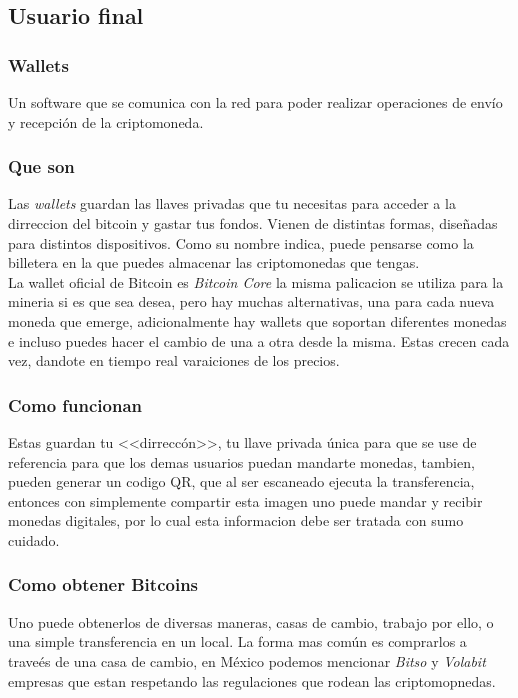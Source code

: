 \documentclass[12pt,letterpaper]{article}
\begin{document}
    \subsection*{Usuario final}

        \subsubsection*{Wallets}
Un software que se comunica con la red para poder realizar operaciones de env\'io y recepci\'on de la criptomoneda.

        \subsubsection*{Que son}
            Las \textit{wallets} guardan las llaves privadas que tu necesitas para acceder a la dirreccion del bitcoin y gastar tus fondos. Vienen de distintas formas, dise\~nadas para distintos dispositivos. Como su nombre indica, puede pensarse como la billetera en la que puedes almacenar las criptomonedas que tengas.
\\
                
            La wallet oficial de Bitcoin es \textit{Bitcoin Core} la misma palicacion se utiliza para la mineria si es que sea desea, pero hay muchas alternativas, una para cada nueva moneda que emerge, adicionalmente hay wallets que soportan diferentes monedas e incluso puedes hacer el cambio de una a otra desde la misma. Estas crecen cada vez, dandote en tiempo real varaiciones de los precios.

        \subsubsection*{Como funcionan}
            Estas guardan tu <<dirrecc\'on>>, tu llave privada \'unica para que se use de referencia para que los demas usuarios puedan mandarte monedas, tambien, pueden generar un codigo QR, que al ser escaneado ejecuta la transferencia, entonces con simplemente compartir esta imagen uno puede mandar y recibir monedas digitales, por lo cual esta informacion debe ser tratada con sumo cuidado.

            \subsubsection*{Como obtener Bitcoins}
	Uno puede obtenerlos de diversas maneras, casas de cambio, trabajo por ello, o una simple transferencia en un local. La forma mas com\'un es comprarlos a trave\'es de una casa de cambio, en M\'exico podemos mencionar \textit{Bitso} y \textit{Volabit} empresas que estan respetando las regulaciones que rodean las criptomopnedas.
	
\end{document}
